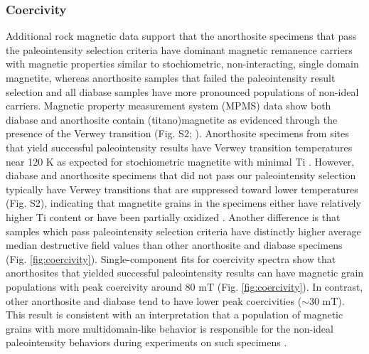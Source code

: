 \documentclass[9pt,twocolumn,twoside,lineno]{pnas-new}
\begin{document}
\subsubsection*{Coercivity}
Additional rock magnetic data support that the anorthosite specimens that pass the paleointensity selection criteria have dominant magnetic remanence carriers with magnetic properties similar to stochiometric, non-interacting, single domain magnetite, whereas anorthosite samples that failed the paleointensity result selection and all diabase samples have more pronounced populations of non-ideal carriers. Magnetic property measurement system (MPMS) data show both diabase and anorthosite contain (titano)magnetite as evidenced through the presence of the Verwey transition (Fig. S2;  \citealp{Verwey1939a, Feinberg2015a}). Anorthosite specimens from sites that yield successful paleointensity results have Verwey transition temperatures near 120 K as expected for stochiometric magnetite with minimal Ti \cite{Ozdemir1993a}. However, diabase and anorthosite specimens that did not pass our paleointensity selection typically have Verwey transitions that are suppressed toward lower temperatures (Fig. S2), indicating that magnetite grains in the specimens either have relatively higher Ti content or have been partially oxidized \cite{Ozdemir1993a}. Another difference is that samples which pass paleointensity selection criteria have distinctly higher average median destructive field values than other anorthosite and diabase specimens (Fig. \ref{fig:coercivity}). Single-component fits for coercivity spectra \cite{Maxbauer2016a} show that anorthosites that yielded successful paleointensity results can have magnetic grain populations with peak coercivity around 80 mT (Fig. \ref{fig:coercivity}). In contrast, other anorthosite and diabase tend to have lower peak coercivities ($\sim$30 mT). This result is consistent with an interpretation that a population of magnetic grains with more multidomain-like behavior is responsible for the non-ideal paleointensity behaviors during experiments on such specimens \cite{Xu2004a}.
\end{document}
